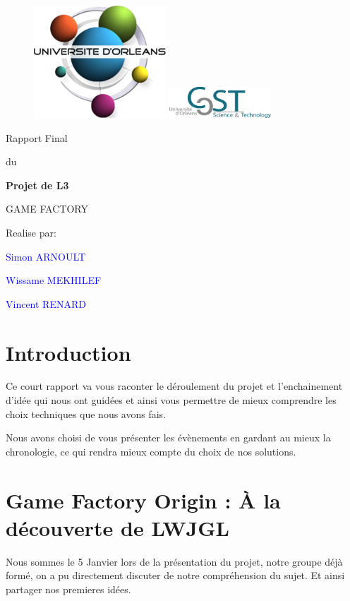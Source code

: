 \documentclass[french,12pt]{article}
\newcommand{\ml}[0]{\par\noindent}
\begin{document}
\thispagestyle{empty}
%
\begin{figure}[H]
\includegraphics[width=0.2\linewidth]{logo_univ.png}
\hfill
\includegraphics[width=1.5in]{logo_ufr.png}
\end{figure}
\vspace{2cm}
%
\begin{center}
{\Huge Rapport Final}
\par\vspace{0.4cm}
{\Large du}
\par\vspace{0.cm}
{\Huge\bf Projet de L3}
\par\vspace{3cm}
{\Huge       GAME FACTORY}
\par\vspace{3cm}
{\Huge       Realise par:}
\par\vspace{0.3cm}
{\Huge\bf \textcolor{blue}{Simon ARNOULT \ml Wissame MEKHILEF \ml\ml Vincent RENARD}}
\end{center}
\newpage
\tableofcontents
\newpage


\section{Introduction}

Ce court rapport va vous raconter le déroulement du projet  et l'enchainement d'idée qui nous ont guidées et ainsi vous permettre de mieux comprendre les choix techniques que nous avons fais.

Nous avons choisi de vous présenter les évènements en gardant au mieux la chronologie, ce qui rendra mieux compte du choix de nos solutions.

\section{Game Factory Origin : À la découverte de LWJGL}

Nous sommes le 5 Janvier lors de la présentation du projet, notre groupe déjà formé, on a pu directement discuter de notre compréhension du sujet. Et ainsi partager nos premieres idées. 
\end{document}
